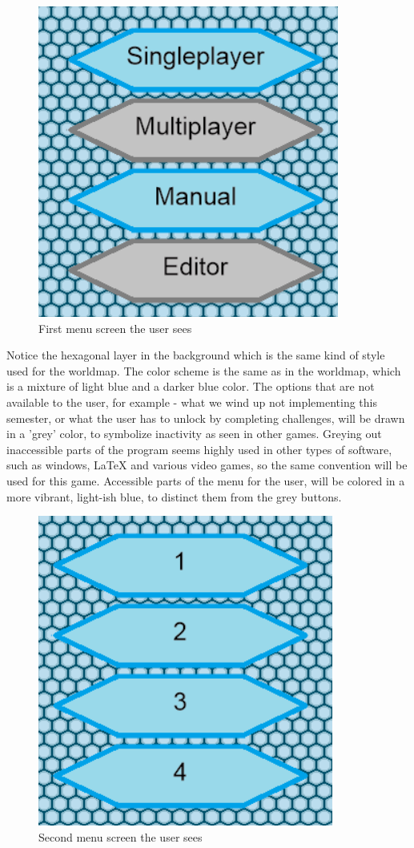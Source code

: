 \begin{figure}[h]
	\centering
		\includegraphics{img/Menu1.png}
	\caption{First menu screen the user sees}
	\label{fig:menu1}
\end{figure}


Notice the hexagonal layer in the background which is the same kind of style used for the worldmap. The color scheme is the same as in the worldmap, 
which is a mixture of light blue and a darker blue color. The options that are not available to the user, for example - what we wind up not 
implementing this semester, or what the user has to unlock by completing challenges, will be drawn in a 'grey' color, to symbolize inactivity as seen 
in other games. Greying out inaccessible parts of the program seems highly used in other types of software, such as windows, LaTeX and various video 
games, so the same convention will be used for this game. Accessible parts of the menu for the user, will be colored in a more vibrant, light-ish blue, 
to distinct them from the grey buttons.
\begin{figure}[h]
	\centering
		\includegraphics{img/Menu2.png}
	\caption{Second menu screen the user sees}
	\label{fig:menu2}
\end{figure}


